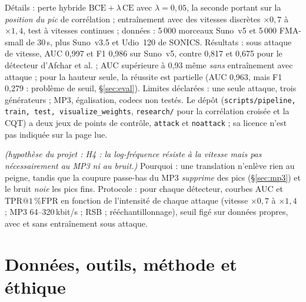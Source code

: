 \documentclass[10pt,a4paper]{article}
\makeatletter
\newcommand{\tprfpr}{\mathrm{TPR}@1\,\%\mathrm{FPR}}
\newcommand{\hyp}[1]{\textit{(hypothèse du projet : #1)}}
\makeatother
\begin{document}
Détails : perte hybride $\mathrm{BCE}+\lambda\,\mathrm{CE}$ avec $\lambda=0{,}05$, la seconde portant sur la \emph{position du pic} de corrélation ; entraînement avec des vitesses discrètes $\times0{,}7$ à $\times1{,}4$, test à vitesses continues ; données : 5\,000 morceaux Suno~v5 et 5\,000 FMA-small de 30\,s, plus Suno~v3.5 et Udio~120 de SONICS. Résultats : sous attaque de vitesse, AUC 0,997 et F1 0,986 sur Suno~v5, contre 0,817 et 0,675 pour le détecteur d'Afchar et al. ; AUC supérieure à 0,93 même \emph{sans} entraînement avec attaque ; pour la hauteur seule, la réussite est partielle (AUC 0,963, mais F1 0,279 : problème de seuil, §\ref{sec:eval}). Limites déclarées : une seule attaque, trois générateurs ; MP3, égalisation, codecs non testés. Le dépôt (\texttt{scripts/pipeline, train, test, visualize\_weights}, \texttt{research/} pour la corrélation croisée et la CQT) a deux jeux de points de contrôle, \texttt{attack} et \texttt{noattack} ; sa licence n'est pas indiquée sur la page lue.

\begin{projet}
\hyp{H4 : la log-fréquence résiste à la vitesse mais pas nécessairement au MP3 ni au bruit.} Pourquoi : une translation n'enlève rien au peigne, tandis que la coupure passe-bas du MP3 \emph{supprime} des pics (§\ref{sec:mp3}) et le bruit \emph{noie} les pics fins. Protocole : pour chaque détecteur, courbes AUC et $\tprfpr$ en fonction de l'intensité de chaque attaque (vitesse $\times0{,}7$ à $\times1{,}4$ ; MP3 64--320\,kbit/s ; RSB ; rééchantillonnage), seuil figé sur données propres, avec et sans entraînement sous attaque.
\end{projet}

\section{Données, outils, méthode et éthique}\label{sec:methode}
\end{document}
